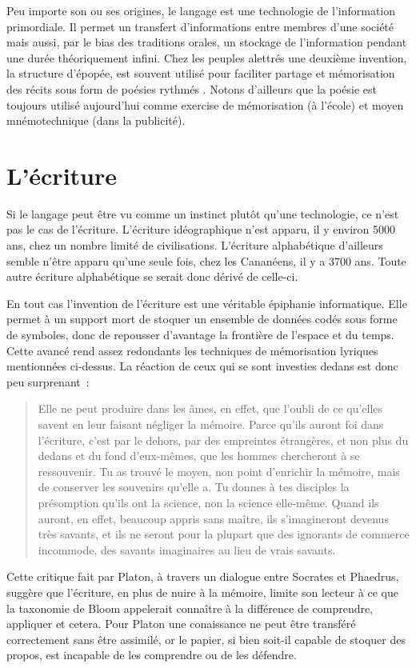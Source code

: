 Peu importe son ou ses origines, le langage est une technologie de l'information primordiale. Il permet un transfert d'informations entre membres d'une société mais aussi, par le bias des traditions orales, un stockage de l'information pendant une durée théoriquement infini. Chez les peuples alettrés une deuxième invention, la structure d'épopée, est souvent utilisé pour faciliter partage et mémorisation des récits sous form de poésies rythmés \cite{havelock-preface-plato}. Notons d'ailleurs que la poésie est toujours utilisé aujourd'hui comme exercise de mémorisation (à l'école) et moyen mnémotechnique (dans la publicité).

\section{L'écriture}
Si le langage peut être vu comme un instinct plutôt qu'une technologie, ce n'est pas le cas de l'écriture. L'écriture idéographique n'est apparu, il y environ 5000 ans, chez un nombre limité de civilisations. L'écriture alphabétique d'ailleurs semble n'être apparu qu'une seule fois, chez les Cananéens, il y a 3700 ans\cite{linguistics-pinker}. Toute autre écriture alphabétique se serait donc dérivé de celle-ci.

En tout cas l'invention de l'écriture est une véritable épiphanie informatique. Elle permet à un support mort de stoquer un ensemble de données codés sous forme de symboles, donc de repousser d'avantage la frontière de l'espace et du temps.
Cette avancé rend assez redondants les techniques de mémorisation lyriques mentionnées ci-dessus. La réaction de ceux qui se sont investies dedans est donc peu surprenant~:
\begin{quote}
Elle ne peut produire dans les âmes, en effet, que l’oubli de ce qu’elles  savent en leur faisant négliger la mémoire. Parce qu’ils auront foi dans  l’écriture, c’est par le dehors, par des empreintes étrangères, et non plus du dedans et du fond d’eux-mêmes, que les hommes chercheront à se ressouvenir. Tu as trouvé le moyen, non point d’enrichir la mémoire, mais de conserver les souvenirs qu’elle a. Tu donnes à tes disciples la présomption qu’ils ont la science, non la science elle-même. Quand ils auront, en effet, beaucoup appris sans maître, ils s’imagineront devenus très savants, et ils ne seront pour la plupart que des ignorants de commerce incommode, des savants imaginaires au lieu de vrais savants.
\end{quote}
Cette critique fait par Platon\cite{plato-phaedrus}, à travers un dialogue entre Socrates et Phaedrus, suggère que l'écriture, en plus de nuire à la mémoire, limite son lecteur à ce que la taxonomie de Bloom\cite{tax-bloom} appelerait \og{}connaître\fg{} à la différence de \og{}comprendre\fg{}, \og{}appliquer\fg{} et cetera. Pour Platon une conaissance ne peut être transféré correctement sans être assimilé, or le papier, si bien soit-il capable de stoquer des propos, est incapable de les comprendre ou de les défendre. 


